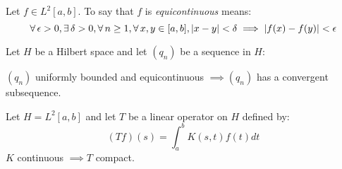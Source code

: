 \documentclass[letterpaper,12pt,fleqn]{article}
\renewcommand{\d}{\delta}
\newcommand{\e}{\epsilon}
\begin{document}
\newpage

\begin{definition}[Equicontinuous]
  Let $f\in L^2[a,b]$. To say that $f$ is \emph{equicontinuous} means:
  \[\forall\,\e>0,\exists\,\d>0,\forall\,n\ge1,\forall\,x,y\in[a,b],
  \abs{x-y}<\d\implies\abs{f(x)-f(y)}<\e\]
\end{definition}

\begin{theorem}
  Let $H$ be a Hilbert space and let $(q_n)$ be a sequence in $H$:

  \qquad$(q_n)$ uniformly bounded and equicontinuous $\implies(q_n)$ has a
  convergent subsequence.
\end{theorem}

\begin{theorem}
  Let $H=L^2[a,b]$ and let $T$ be a linear operator on $H$ defined by:
  \[(Tf)(s)=\int_a^bK(s,t)f(t)dt\]
  $K$ continuous $\implies T$ compact.
\end{theorem}
\end{document}
